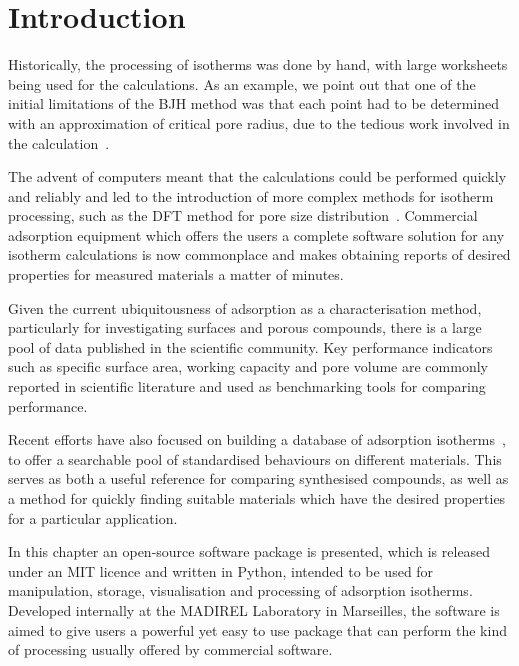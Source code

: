 
\section{Introduction}

Historically, the processing of isotherms was done by hand, with large 
worksheets being used for the calculations. As an example, 
we point out that one of the initial limitations of the BJH method was 
that each point had to 
be determined with an approximation of critical pore radius, due to the 
tedious work involved in the calculation~\cite{barrettDeterminationPoreVolume1951}.

The advent of computers meant that the calculations could be performed
quickly and reliably and led to the introduction of more complex
methods for isotherm processing, such as the DFT method for pore size
distribution~\cite{seatonNewAnalysisMethod1989, tarazonaPhaseEquilibriaFluid1987}. 
Commercial adsorption equipment which offers the users
a complete software solution for any isotherm calculations is now
commonplace and makes obtaining reports of desired properties
for measured materials a matter of minutes.

Given the current ubiquitousness of adsorption as a characterisation method,
particularly for investigating surfaces and porous compounds,
there is a large pool of data published in the scientific community.
Key performance indicators such as specific surface area, working 
capacity and pore volume are commonly reported in scientific literature
and used as benchmarking tools for comparing performance.

Recent efforts have also focused on building a database of adsorption 
isotherms~\cite{sideriusNISTARPAEDatabase2015}, to offer a searchable pool of 
standardised behaviours on different materials. This serves as both a
useful reference for comparing synthesised compounds, as well as a
method for quickly finding suitable materials which have the desired properties
for a particular application.

In this chapter an open-source software package is presented, which 
is released under an MIT licence and written in Python, intended to be used for 
manipulation, storage, visualisation and processing of adsorption isotherms.
Developed internally at the MADIREL Laboratory in
Marseilles, the software is aimed to give users a powerful yet easy to
use package that can perform the kind of processing usually offered by
commercial software.
